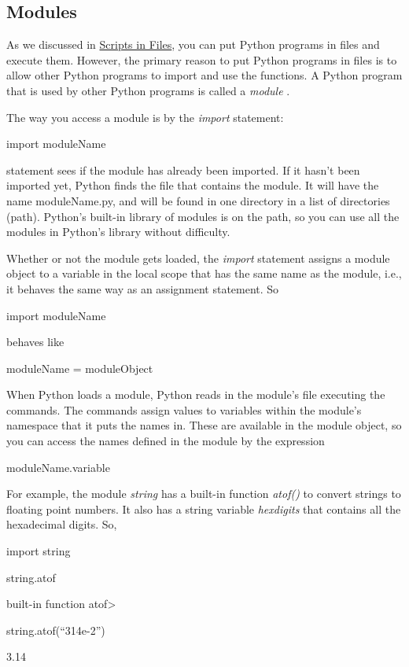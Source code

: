 
\subsection{Modules}

As we discussed in
\href{chap2.html\#30113}{Scripts in Files}, you can put Python programs
in files and execute them. However, the primary reason to put Python
programs in files is to allow other Python programs to import and use
the functions. A Python program that is used by other Python programs is
called a \emph{module} .

The way you access a module is by
the \emph{import} statement:

import moduleName

 statement sees if
the module has already been imported. If it hasn't been imported yet,
Python finds the file that contains the module. It will have the name
moduleName.py, and will be found in one directory in a list of
directories (path). Python's built-in library of modules is on the path,
so you can use all the modules in Python's library without difficulty.

Whether or not the module gets
loaded, the \emph{import} statement assigns a module object to a
variable in the local scope that has the same name as the module, i.e.,
it behaves the same way as an assignment statement. So

import moduleName

behaves like

moduleName = moduleObject

When Python loads a module, Python
reads in the module's file executing the commands. The commands assign
values to variables within the module's namespace that it puts the names
in. These are available in the module object, so you can access the
names defined in the module by the expression

moduleName.variable

For example, the module
\emph{string} has a built-in function \emph{atof()} to convert strings
to floating point numbers. It also has a string variable
\emph{hexdigits} that contains all the hexadecimal digits. So,


import string


string.atof

built-in function
atof\textgreater{}


string.atof(``314e-2'')

3.14


